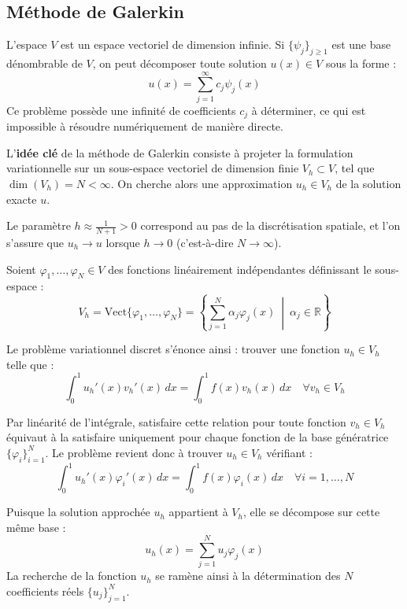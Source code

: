 \subsection{Méthode de Galerkin}

L'espace $V$ est un espace vectoriel de dimension infinie. Si $\{\psi_j\}_{j \ge 1}$ est une base dénombrable de $V$, on peut décomposer toute solution $u(x) \in V$ sous la forme :
$$u(x) = \sum_{j=1}^{\infty} c_j \psi_j(x)$$
Ce problème possède une infinité de coefficients $c_j$ à déterminer, ce qui est impossible à résoudre numériquement de manière directe.

L'\textbf{idée clé} de la méthode de Galerkin consiste à projeter la formulation variationnelle sur un sous-espace vectoriel de dimension finie $V_h \subset V$, tel que $\dim(V_h) = N < \infty$. On cherche alors une approximation $u_h \in V_h$ de la solution exacte $u$. 

Le paramètre $h \approx \frac{1}{N+1} > 0$ correspond au pas de la discrétisation spatiale, et l'on s'assure que $u_h \to u$ lorsque $h \to 0$ (c'est-à-dire $N \to \infty$).

Soient $\varphi_1, \dots, \varphi_N \in V$ des fonctions linéairement indépendantes définissant le sous-espace :
$$V_h = \text{Vect}\{\varphi_1, \dots, \varphi_N\} = \left\{ \sum_{j=1}^{N} \alpha_j \varphi_j(x) \ \middle|\ \alpha_j \in \mathbb{R} \right\}$$

\begin{definition}
Le problème variationnel discret s'énonce ainsi : trouver une fonction $u_h \in V_h$ telle que :
\begin{equation}
\int_{0}^{1} u_h'(x) v_h'(x) \, dx = \int_{0}^{1} f(x) v_h(x) \, dx \quad \forall v_h \in V_h
\label{eq:galerkin_weak}
\end{equation}
\end{definition}

Par linéarité de l'intégrale, satisfaire cette relation pour toute fonction $v_h \in V_h$ équivaut à la satisfaire uniquement pour chaque fonction de la base génératrice $\{\varphi_i\}_{i=1}^N$. Le problème revient donc à trouver $u_h \in V_h$ vérifiant :
\begin{equation}
\int_{0}^{1} u_h'(x) \varphi_i'(x) \, dx = \int_{0}^{1} f(x) \varphi_i(x) \, dx \quad \forall i = 1, \dots, N
\end{equation}

Puisque la solution approchée $u_h$ appartient à $V_h$, elle se décompose sur cette même base :
$$u_h(x) = \sum_{j=1}^{N} u_j \varphi_j(x)$$
La recherche de la fonction $u_h$ se ramène ainsi à la détermination des $N$ coefficients réels $\{u_j\}_{j=1}^N$.


